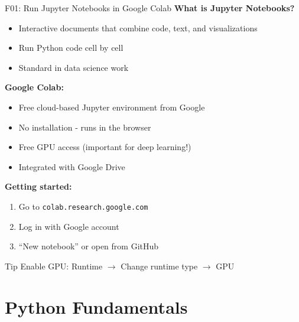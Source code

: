 \documentclass[aspectratio=169, 10pt]{beamer}
\begin{document}
\begin{frame}{F01: Run Jupyter Notebooks in Google Colab}
    \textbf{What is Jupyter Notebooks?}
    \begin{itemize}
        \item Interactive documents that combine code, text, and visualizations
        \item Run Python code cell by cell
        \item Standard in data science work
    \end{itemize}
    
    \vspace{0.3cm}
    \textbf{Google Colab:}
    \begin{itemize}
        \item Free cloud-based Jupyter environment from Google
        \item No installation - runs in the browser
        \item Free GPU access (important for deep learning!)
        \item Integrated with Google Drive
    \end{itemize}
    
    \vspace{0.3cm}
    \textbf{Getting started:}
    \begin{enumerate}
        \item Go to \texttt{colab.research.google.com}
        \item Log in with Google account
        \item ``New notebook'' or open from GitHub
    \end{enumerate}
    
    \begin{block}{\footnotesize Tip}
        \footnotesize Enable GPU: Runtime $\rightarrow$ Change runtime type $\rightarrow$ GPU
    \end{block}
\end{frame}

\section{Python Fundamentals}
\end{document}
